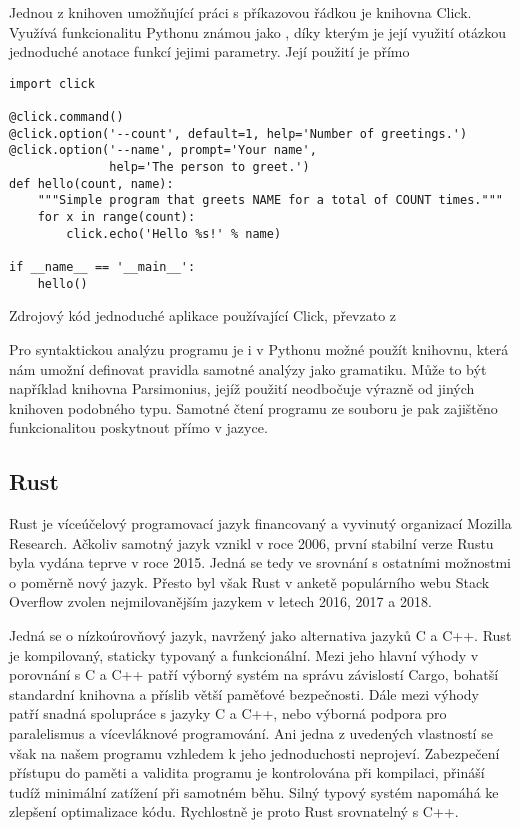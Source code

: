 Jednou z knihoven umožňující práci s příkazovou řádkou je knihovna Click\cite{website-click}. Využívá funkcionalitu Pythonu známou jako , díky kterým je její využití otázkou jednoduché anotace funkcí jejimi parametry. Její použití je přímo

\begin{listing}
\begin{verbatim}
import click

@click.command()
@click.option('--count', default=1, help='Number of greetings.')
@click.option('--name', prompt='Your name',
              help='The person to greet.')
def hello(count, name):
    """Simple program that greets NAME for a total of COUNT times."""
    for x in range(count):
        click.echo('Hello %s!' % name)

if __name__ == '__main__':
    hello()
\end{verbatim}
\caption{Zdrojový kód jednoduché aplikace používající Click, převzato z \cite{website-click}}
\label{fig:click-source}
\end{listing}

Pro syntaktickou analýzu programu je i v Pythonu možné použít knihovnu, která nám umožní definovat pravidla samotné analýzy jako gramatiku. Může to být například knihovna Parsimonius\cite{github-parsimonious}, jejíž použití neodbočuje výrazně od jiných knihoven podobného typu. Samotné čtení programu ze souboru je pak zajištěno funkcionalitou poskytnout přímo v jazyce.

\subsection{Rust}
\label{assembler:rust}

Rust je víceúčelový programovací jazyk financovaný a vyvinutý organizací Mozilla Research\cite{rust-faq}. Ačkoliv samotný jazyk vznikl v roce 2006\cite{rust-faq}, první stabilní verze Rustu byla vydána teprve v roce 2015\cite{rust-faq}. Jedná se tedy ve srovnání s ostatními možnostmi o poměrně nový jazyk. Přesto byl však Rust v anketě populárního webu Stack Overflow zvolen nejmilovanějším jazykem v letech 2016\cite{so-survey-2016}, 2017\cite{so-survey-2017} a 2018\cite{so-survey-2018}.

Jedná se o nízkoúrovňový jazyk, navržený jako alternativa jazyků C a C++. Rust je kompilovaný, staticky typovaný a funkcionální\cite{rust-faq}. Mezi jeho hlavní výhody v porovnání s C a C++ patří výborný systém na správu závislostí Cargo, bohatší standardní knihovna a příslib větší paměťové bezpečnosti. Dále mezi výhody patří snadná spolupráce s jazyky C a C++, nebo výborná podpora pro paralelismus a vícevláknové programování. Ani jedna z uvedených vlastností se však na našem programu vzhledem k jeho jednoduchosti neprojeví. Zabezpečení přístupu do paměti a validita programu je kontrolována při kompilaci\cite{rust-faq}, přináší tudíž minimální zatížení při samotném běhu. Silný typový systém napomáhá ke zlepšení optimalizace kódu. Rychlostně je proto Rust srovnatelný s C++\cite{rust-vs-cpp}.

